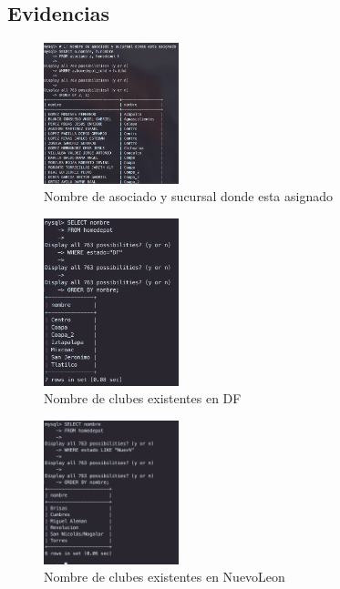 \documentclass[12pt, fleqn]{article}                             %
\begin{document}
    \subsection{Evidencias}

        \begin{figure}[ht!]
            \centering
            \includegraphics[width=0.35\textwidth]{BD3Reporte0}
            \caption{Nombre de asociado y sucursal donde esta asignado}
        \end{figure}

        \begin{figure}[ht!]
            \centering
            \includegraphics[width=0.35\textwidth]{BD3Reporte1}
            \caption{Nombre de clubes existentes en DF}
        \end{figure}


        \begin{figure}[ht!]
            \centering
            \includegraphics[width=0.35\textwidth]{BD3Reporte2}
            \caption{Nombre de clubes existentes en NuevoLeon}
        \end{figure}
\end{document}
